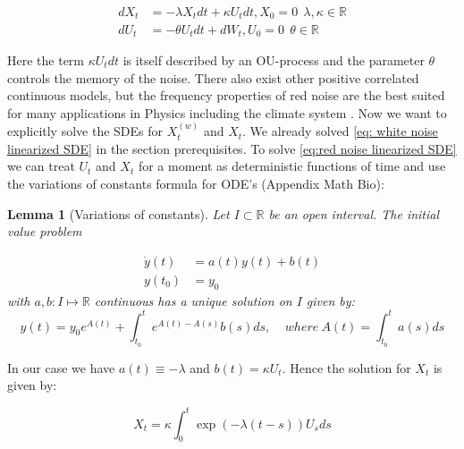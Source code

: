 \documentclass[%
thesis=student,%
coverpage=false,%
titlepage=false,%
headmarks=true, %
english,%
font=libertine, %
math=newpxtx, %
BCOR=5mm,%
coverBCOR=11mm%
]{tumbook}
\newtheorem{lemma}{Lemma}
\begin{document}
\begin{subequations}
    \begin{align}
        dX_{t} &= -\lambda X_{t}dt + \kappa U_{t}dt, X_{0} = 0 \label{eq: 3.2a} \ \ \lambda,\kappa \in \mathbb{R}  \\ 
        dU_{t} &= -\theta U_{t}dt + dW_{t}, U_{0} = 0 \label{eq: 3.2b} \ \ \theta \in \mathbb{R}
    \end{align}
    \label{eq:red noise linearized SDE}
\end{subequations}

Here the term $\kappa U_{t}dt$ is itself described by an OU-process and the parameter $\theta$ controls the memory of the noise. There also exist other positive correlated continuous models, but the frequency properties of red noise are the best suited for many applications in Physics including the climate system \cite{Hasselmann:1976, Hanggi:1993, Liao:2022}. 
Now we want to explicitly solve the SDEs for $X_{t}^{(w)}$ and $X_{t}$. We already solved \eqref{eq: white noise linearized SDE} in the section prerequisites. To solve \eqref{eq:red noise linearized SDE} we can treat $U_{t}$ and $X_{t}$ for a moment as deterministic functions of time and use the variations of constants formula for ODE's (Appendix Math Bio): \\

\begin{lemma}[Variations of constants]
    Let $I \subset \mathbb{R}$ be an open interval. The initial value problem
        
    \begin{subequations}
        \begin{align}
            \dot{y}(t) &= a(t)y(t) + b(t)  \\
            y(t_{0}) &= y_{0}
        \end{align}
    \end{subequations}
    with $a,b : I \mapsto \mathbb{R}$ continuous has a unique solution on $I$ given by:
    \[
    y(t) = y_{0}e^{A(t)} + \int_{t_{0}}^{t}e^{A(t)-A(s)}b(s)ds, \ \ \ \ \ where \ A(t) = \int_{t_{0}}^{t}a(s)ds
    \]
\end{lemma}
In our case we have $a(t) \equiv -\lambda$ and $b(t) = \kappa U_{t}$. Hence the solution for $X_{t}$ is given by:

\begin{equation}
    X_{t} = \kappa\int_{0}^{t}\exp(-\lambda(t-s))U_{s}ds
    \label{red noise solution}
\end{equation}
\end{document}
